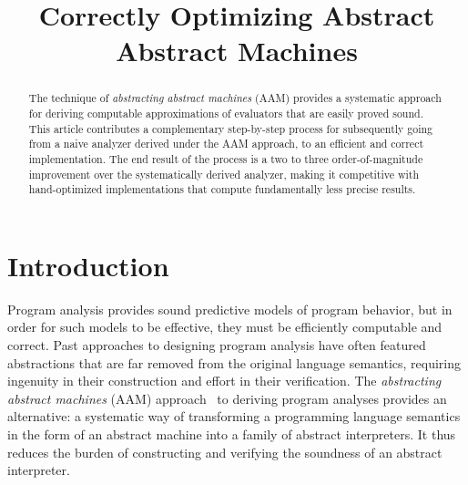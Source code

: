\documentclass[preprint,onecolumn,9pt]{sigplanconf} %
\newcommand{\naive}{naive}
\begin{document}
\copyrightdata{[to be supplied]}


\title{Correctly Optimizing Abstract Abstract Machines}

           {}
           {}
\maketitle

\begin{abstract}
The technique of \emph{abstracting abstract machines} (AAM) provides a
systematic approach for deriving computable approximations of
evaluators that are easily proved sound.
%
This article contributes a complementary step-by-step process for
subsequently going from a \naive{} analyzer derived under the AAM
approach, to an efficient and correct implementation.  The end result
of the process is a two to three order-of-magnitude improvement over
the systematically derived analyzer, making it competitive with
hand-optimized implementations that compute fundamentally less precise
results.
\end{abstract}




\section{Introduction}

Program analysis provides sound predictive models of program behavior, but
in order for such models to be effective, they must be efficiently
computable and correct.  Past approaches to designing program analysis
have often featured abstractions that are far removed from the
original language semantics, requiring ingenuity in their construction
and effort in their verification.
%
The \emph{abstracting abstract machines} (AAM)
approach~\cite{dvanhorn:VanHorn2011Abstracting,dvanhorn:VanHorn2012Systematic}
to deriving program analyses provides an alternative: a systematic way
of transforming a programming language semantics in the form of an
abstract machine into a family of abstract interpreters.  It thus reduces
the burden of constructing and verifying the soundness of an abstract
interpreter.
%
\end{document}
